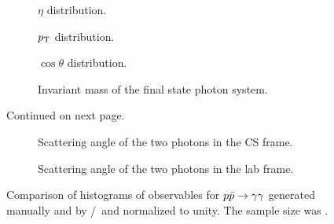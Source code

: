 \begin{figure}[hp]
  \centering
  \begin{subfigure}{.49\textwidth}
    \centering {}
    \caption{\label{fig:pdf-eta} \(\eta\) distribution.}
  \end{subfigure}
  \begin{subfigure}{.49\textwidth}
    \centering {}
    \caption{\label{fig:pdf-pt} \(p_\mathrm{T}\) distribution.}
  \end{subfigure}
  \begin{subfigure}{.49\textwidth}
    \centering {}
    \caption{\label{fig:pdf-cos-theta} \(\cos\theta\) distribution.}
  \end{subfigure}
  \begin{subfigure}{.49\textwidth}
    \centering {}
    \caption[Histogram of the invariant mass of the final state photon
    system.]{\label{fig:pdf-inv-m} Invariant mass of the
      final state photon system. %
    }
  \end{subfigure}
  \caption{Continued on next page.}
\end{figure}
%
\begin{figure}
  \ContinuedFloat
  \begin{subfigure}{.49\textwidth}
    \centering {}
    \caption{\label{fig:pdf-o-angle-cs} Scattering angle of the two
      photons in the CS frame.}
  \end{subfigure}
  \begin{subfigure}{.49\textwidth}
    \centering {}
    \caption{\label{fig:pdf-o-angle} Scattering angle of the two
      photons in the lab frame.}
  \end{subfigure}
  \caption{\label{fig:pdf-histos}Comparison of histograms of
    observables for \(p\bar{p}\rightarrow\gamma\gamma\) generated manually and by
    \sherpa/\rivet\ and normalized to unity. The sample size was
    \protect {}.}
\end{figure}
%
